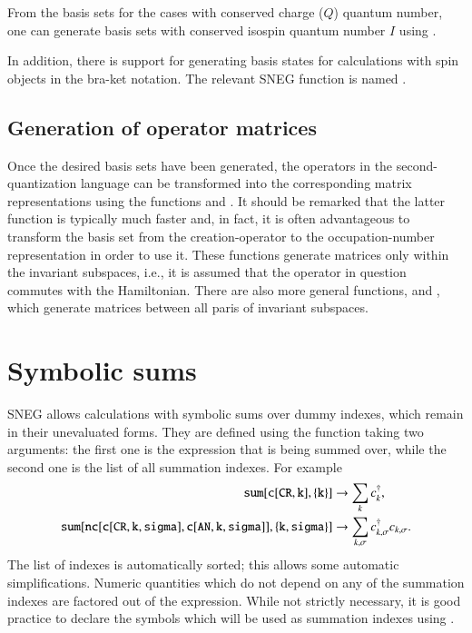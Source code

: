 \documentclass[3p,number,preprint]{elsarticle}
\begin{document}
From the basis sets for the cases with conserved charge ($Q$) quantum
number, one can generate basis sets with conserved isospin quantum
number $I$ using .

In addition, there is support for generating basis states for
calculations with spin objects in the bra-ket notation. The relevant
SNEG function is named .


\subsection{Generation of operator matrices}

Once the desired basis sets have been generated, the operators in the
second-quantization language can be transformed into the corresponding
matrix representations using the functions  and
. It should be remarked that the latter function
is typically much faster and, in fact, it is often advantageous to
transform the basis set from the creation-operator to the
occupation-number representation in order to use it. These functions
generate matrices only within the invariant subspaces, i.e., it is
assumed that the operator in question commutes with the Hamiltonian.
There are also more general functions,  and
, which generate matrices between all paris
of invariant subspaces.



\section{Symbolic sums}
\label{sec4}

SNEG allows calculations with symbolic sums over dummy indexes, which
remain in their unevaluated forms. They are defined using the
function  taking two arguments: the first one is the
expression that is being summed over, while the second one is the list
of all summation indexes. For example
%
\begin{equation}
\begin{split}
{\tt sum[c[CR,k],\{k\}]} &\to \sum_k c^\dag_k, \\
{\tt sum[nc[c[CR,k,sigma],c[AN,k,sigma]],\{k,sigma\}]} 
&\to \sum_{k,\sigma} c^\dag_{k,\sigma} c_{k,\sigma}.
\end{split}
\end{equation}
%
The list of indexes is automatically sorted; this allows some
automatic simplifications. Numeric quantities which do not depend on
any of the summation indexes are factored out of the 
expression. While not strictly necessary, it is good practice to
declare the symbols which will be used as summation indexes using
.
\end{document}
